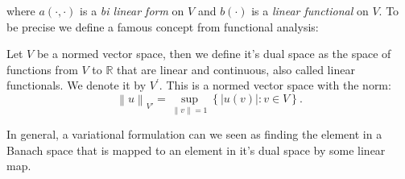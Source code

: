\documentclass[../Main/main.tex]{subfiles}
\begin{document}
	where $a(\cdot,\cdot)$ is a \emph{bi linear form} on $V$ and $b(\cdot)$ is a \emph{linear functional} on $V$. To be precise we define a famous concept from functional analysis:
	\begin{definition}
		Let $V$ be a normed vector space, then we define it's dual space as the space of functions from $V$ to $\mathbb{R}$ that are linear and continuous, also called linear functionals. We denote it by $V^{'}$. This is a normed vector space with the norm: \begin{equation*}
\left \| u \right \|_{V'} = \sup_{\left \| v \right \|=1}\left \{ |u(v)|:v\in V \right \}. 		\end{equation*}
	\end{definition}
	In general, a variational formulation can we seen as finding the element in a Banach space that is mapped to an element in it's dual space by some linear map.
\end{document}
